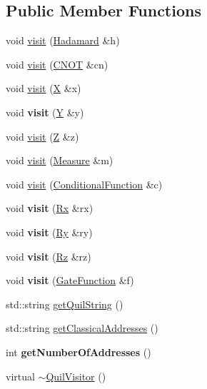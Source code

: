 \subsection*{Public Member Functions}
\begin{DoxyCompactItemize}
\item 
void \hyperlink{a00241_a5470d573fdcfd691c100fcbfeeed45db}{visit} (\hyperlink{a00137}{Hadamard} \&h)
\item 
void \hyperlink{a00241_ac51ed9d947d3fa00525eb79b2bbc9021}{visit} (\hyperlink{a00058}{C\+N\+OT} \&cn)
\item 
void \hyperlink{a00241_a0b1a31a900f87a3f91f640ab5caec126}{visit} (\hyperlink{a00336}{X} \&x)
\item 
void {\bfseries visit} (\hyperlink{a00342}{Y} \&y)\hypertarget{a00241_a403f2d506425ee5a0098b1b54de7e4e8}{}\label{a00241_a403f2d506425ee5a0098b1b54de7e4e8}

\item 
void \hyperlink{a00241_af429121067a397eeac17328fc0244859}{visit} (\hyperlink{a00343}{Z} \&z)
\item 
void \hyperlink{a00241_acbe2afe1c9741112d1f9196681f8b896}{visit} (\hyperlink{a00215}{Measure} \&m)
\item 
void \hyperlink{a00241_a7665ecdf9984374f52d30d7767649cf9}{visit} (\hyperlink{a00060}{Conditional\+Function} \&c)
\item 
void {\bfseries visit} (\hyperlink{a00256}{Rx} \&rx)\hypertarget{a00241_a81a75fb24d368aeb8396d2cbde0bbfb4}{}\label{a00241_a81a75fb24d368aeb8396d2cbde0bbfb4}

\item 
void {\bfseries visit} (\hyperlink{a00257}{Ry} \&ry)\hypertarget{a00241_ad74c7ec734670c2a5478ebb40e097bfc}{}\label{a00241_ad74c7ec734670c2a5478ebb40e097bfc}

\item 
void {\bfseries visit} (\hyperlink{a00258}{Rz} \&rz)\hypertarget{a00241_aa3823bdeb4d930f753d4b421730c5912}{}\label{a00241_aa3823bdeb4d930f753d4b421730c5912}

\item 
void {\bfseries visit} (\hyperlink{a00111}{Gate\+Function} \&f)\hypertarget{a00241_addedb7635dd200885904611e4cae39d4}{}\label{a00241_addedb7635dd200885904611e4cae39d4}

\item 
std\+::string \hyperlink{a00241_a9808ecc5766ea2c387107dff6b64cdb8}{get\+Quil\+String} ()
\item 
std\+::string \hyperlink{a00241_ab4a1c6a92772a09c22068ced7d3dc76c}{get\+Classical\+Addresses} ()
\item 
int {\bfseries get\+Number\+Of\+Addresses} ()\hypertarget{a00241_a561aabf6de48ae9aee4fbe868f1c5da1}{}\label{a00241_a561aabf6de48ae9aee4fbe868f1c5da1}

\item 
virtual \hyperlink{a00241_a90dcced4e75c7b45c287fb4edc58ed01}{$\sim$\+Quil\+Visitor} ()
\end{DoxyCompactItemize}
